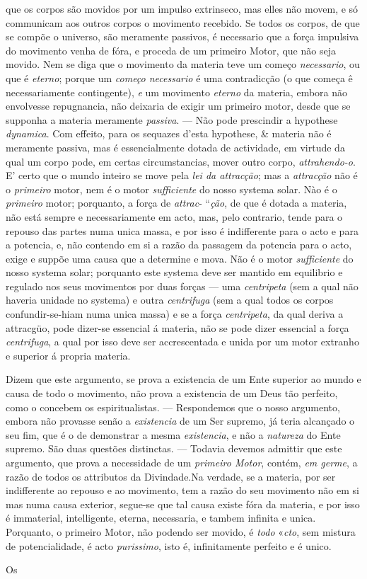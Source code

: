 que os corpos são movidos por um impulso extrinseco, mas elles não movem, e só communicam aos outros corpos o movimento recebido. Se todos os corpos, de que se compõe o universo, são meramente passivos, é necessario que a força impulsiva do movimento venha de fóra, e proceda de um primeiro Motor, que não seja movido. Nem se diga que o movimento da materia teve um começo \emph{necessario}, ou que é \emph{eterno}; porque um \emph{começo necessario} é uma contradicção (o que começa ê necessariamente contingente), \emph{e} um movimento \emph{eterno} da materia, embora não envolvesse repugnancia, não deixaria de exigir um primeiro motor, desde que se supponha a materia meramente \emph{passiva}. --- Não pode prescindir a hypothese \emph{dynamica}. Com effeito, para os sequazes d'esta hypothese, \& materia não é meramente passiva, mas é essencialmente dotada de actividade, em virtude da qual um corpo pode, em certas circumstancias, mover outro corpo, \emph{attrahendo-o}. E' certo que o mundo inteiro se move pela \emph{lei da attracção}; mas a \emph{attracção} não é o \emph{primeiro} motor, nem é o motor \emph{sufficiente} do nosso systema solar. Nào é o \emph{primeiro} motor; porquanto, a força de \emph{attrac}- “\emph{ção}, de que é dotada a materia, não está sempre e necessariamente em acto, mas, pelo contrario, tende para o repouso das partes numa unica massa, e por isso é indifferente para o acto e para a potencia, e, não contendo em si a razão da passagem da potencia para o acto, exige e suppõe uma causa que a determine e mova. Não é o motor \emph{sufficiente} do nosso systema solar; porquanto este systema deve ser mantido em equilibrio e regulado nos seus movimentos por duas forças --- uma \emph{centripeta} (sem a qual não haveria unidade no systema) e outra \emph{centrifuga} (sem a qual todos os corpos confundir-se-hiam numa unica massa) e se a força \emph{centripeta}, da qual deriva a attracgüo, pode dizer-se essencial á materia, não se pode dizer essencial a força \emph{centrifuga}, a qual por isso deve ser accrescentada e unida por um motor extranho e superior á propria materia.\par Dizem que este argumento, se prova a existencia de um Ente superior ao mundo e causa de todo o movimento, não prova a existencia de um Deus tão perfeito, como o concebem os espiritualistas. --- Respondemos que o nosso argumento, embora não provasse senão a \emph{existencia} de um Ser supremo, já teria alcançado o seu fim, que é o de demonstrar a mesma \emph{existencia}, e não a \emph{natureza} do Ente supremo. São duas questões distinctas. --- Todavia devemos admittir que este argumento, que prova a necessidade de um \emph{primeiro Motor}, contém, \emph{em germe}, a razão de todos os attributos da Divindade.Na verdade, se a materia, por ser indifferente ao repouso e ao movimento, tem a razão do seu movimento não em si mas numa causa exterior, segue-se que tal causa existe fóra da materia, e por isso é immaterial, intelligente, eterna, necessaria, e tambem infinita e unica. Porquanto, o primeiro Motor, não podendo ser movido, é \emph{todo} «\emph{cto}, sem mistura de potencialidade, é acto \emph{purissimo}, isto é, infinitamente perfeito e é unico.\par Os 